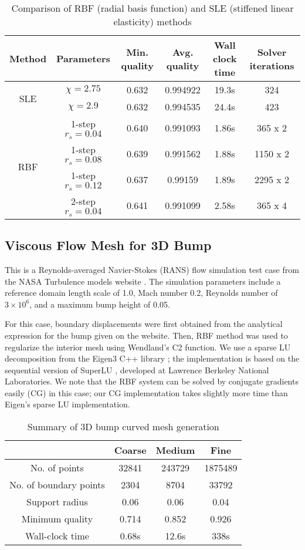 \begin{table}[h!]
\begin{tabular}{|c|c|c|c|c|c|}
\hline
 Method & Parameters & Min. quality & Avg. quality & Wall clock time & Solver iterations \\
 \hline
\multirow{2}{0.5in}{SLE} & $\chi=2.75$ & 0.632 & 0.994922 & 19.3s & 324 \\
				 & $\chi=2.9$ & 0.632 & 0.994535 & 24.4s & 423 \\
\hline
\multirow{4}{0.5in}{RBF} & 1-step $r_s=0.04$ & 0.640 & 0.991093 & 1.86s & 365 x 2 \\
				&   1-step $r_s=0.08$ & 0.639 & 0.991562 & 1.88s & 1150 x 2\\
				&   1-step $r_s=0.12$ & 0.637 & 0.99159  & 1.89s & 2295 x 2 \\
				&   2-step $r_s=0.04$ & 0.641 & 0.991099 & 2.58s & 365 x 4\\
\hline
\end{tabular}
\caption{Comparison of RBF (radial basis function) and SLE (stiffened linear elasticity) methods}
\label{tab:rbfelast}
\end{table}
 
\FloatBarrier

\subsection{Viscous Flow Mesh for 3D Bump}
This is a Reynolds-averaged Navier-Stokes (RANS) flow simulation test case from the NASA Turbulence models website \cite{case:bump3d}. The simulation parameters include a reference domain length scale of 1.0, Mach number 0.2, Reynolds number of $3\times 10^6$, and a  maximum bump height of 0.05.

For this case, boundary displacements were first obtained from the analytical expression for the bump given on the website. Then, RBF method was used to regularize the interior mesh using Wendland's C2 function. We use a sparse LU decomposition from the Eigen3 C++ library \cite{eigenweb}; the implementation is based on the sequential version of SuperLU \cite{superlu}, developed at Lawrence Berkeley National Laboratories. We note that the RBF system can be solved by conjugate gradients easily (CG) in this case; our CG implementation takes slightly more time than Eigen's sparse LU implementation.

\begin{table}[!h]
\centering
\begin{tabular}{|c|c|c|c|}
	\hline
	  & Coarse & Medium & Fine \\
	 \hline
	 No. of points 				& 32841 & 243729	& 1875489 \\
	 No. of boundary points		& 2304	& 8704		& 33792 \\
	 Support radius				& 0.06	& 0.06		& 0.04 \\
	 Minimum quality			& 0.714	& 0.852		& 0.926 \\
	 Wall-clock time			& 0.68s	& 12.6s		& 338s \\
	 \hline
\end{tabular}
\caption{Summary of 3D bump curved mesh generation}
\end{table}

